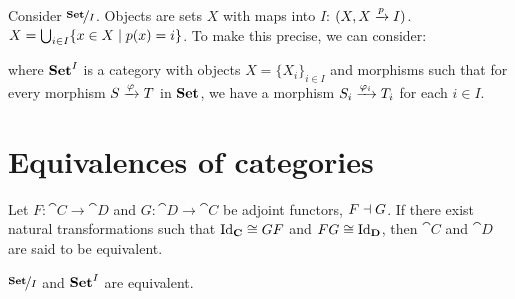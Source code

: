 Consider  $\nicefrac{\mathbf {Set}}{I}$. Objects are sets $X$ with maps into $I$: $(X, X \xrightarrow{p} I)$. $X = \bigcup_{i \in I} \{x \in X \mid p(x) = i\}$. To make this precise, we can consider:

\begin{center}
\end{center}

where $\mathbf {Set}^I$ is a category with objects $X = \{X_i\}_{i \in I}$ and morphisms such that for every morphism $S \xrightarrow{\varphi} T$ in $\mathbf {Set}$, we have a morphism $S_i \xrightarrow{\varphi_i} T_i$ for each $i \in I$.

\begin{center}
\end{center}

\section{Equivalences of categories}

\begin{definition}
Let $F: \cat{C} \to \cat{D}$ and $G: \cat{D} \to \cat{C}$ be adjoint functors, $F \dashv G$. If there exist natural transformations such that $\mathrm{Id}_{ \mathbf{C} } \cong GF$ and $FG \cong \mathrm{Id}_{ \mathbf{D} }$, then $\cat{C}$ and $\cat{D}$ are said to be equivalent.
\end{definition}

$\nicefrac{\mathbf {Set}}{I}$ and $\mathbf {Set}^{I}$ are equivalent.

\begin{center}
\end{center}

